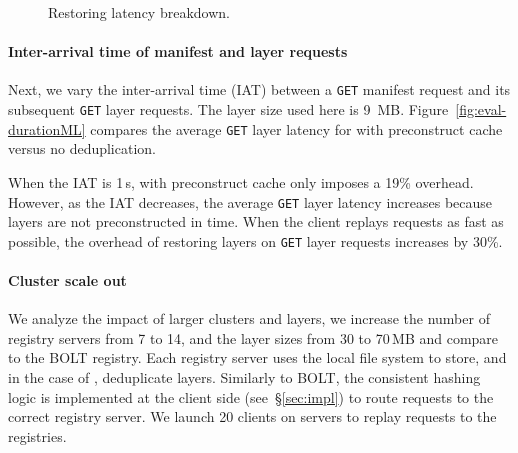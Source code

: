 \begin{figure}[t]
\begin{minipage}{0.3\textwidth}
	\caption{Restoring latency breakdown. }
	\label{fig:eval-restoringbreakdown}
	\end{minipage}
\end{figure}
 
\paragraph{Inter-arrival time of manifest and layer requests}
%
Next, we vary the inter-arrival time (IAT) between a \texttt{GET} manifest request and its
subsequent \texttt{GET} layer requests.
%
The layer size used here is 9~MB.
%
Figure~\ref{fig:eval-durationML} compares the average \texttt{GET} layer latency for
\sysname with preconstruct cache versus no deduplication.

When the IAT is 1\,s, \sysname with preconstruct cache only imposes a 19\% overhead.
%
However, as the IAT decreases, the average \texttt{GET} layer latency increases because
layers are not preconstructed in time.
%
When the client replays requests as fast as possible, the overhead of restoring layers on
\texttt{GET} layer requests increases by 30\%.
%


\paragraph{Cluster scale out}
%
We analyze the impact of larger clusters and layers, we increase the number of registry servers from
7 to 14, and the layer sizes from 30 to 70\,MB and compare \sysname to the BOLT registry.
%
%
Each registry server uses the local file system to store, and in the case of \sysname, deduplicate layers.
%
Similarly to BOLT, the consistent hashing logic is implemented at the client
side (see~\S\ref{sec:impl}) to route requests to the correct registry server.
We launch 20 clients on \gap servers to replay requests to the registries.

